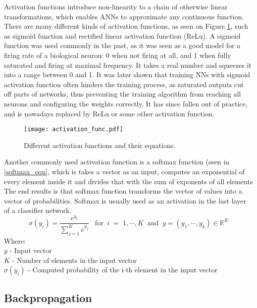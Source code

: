 Activation functions introduce non-linearity to a chain of otherwise linear transformations, which enables ANNs to approximate any continuous function\cite{geron}.
There are many different kinds of activation functions, as seen on Figure \ref{activation_functions}, such as sigmoid function and rectified linear activation function (ReLu).
A sigmoid function was used commonly in the past, as it was seen as a good model for a firing rate of a biological neuron: 0 when not firing at all, and 1 when fully saturated and firing at maximal frequency\cite{cs231n}.
It takes a real number and squeezes it into a range between 0 and 1.
It was later shown that training NNs with sigmoid activation function often hinders the training process, as saturated outputs cut off parts of networks, thus preventing the training algorithm from reaching all neurons and configuring the weights correctly\cite{cs231n}.
It has since fallen out of practice, and is nowadays replaced by ReLu or some other activation function.

\begin{figure}[ht!]
        \centering
        \texttt{[image: activation\_func.pdf]} 
        \caption{Different activation functions and their equations.}
        \label{activation_functions}
\end{figure}


Another commonly used activation function is a softmax function (seen in \ref{softmax_equ}, which is takes a vector as an input, computes an exponential of every element inside it and divides that with the sum of exponents of all elements\cite{geron}
The end results is that softmax function transforms the vector of values into a vector of probabilities.
Softmax is usually used as an activation in the last layer of a classifier network. 
\begin{equation}\label{softmax_equ}
    \sigma(y_i) = \frac{e^{y_i}}{\sum_{j=1}^{K}e^{y_j}}\;\;\;\text{for}\;\;i\;=\;1,\cdots,K\;\;\text{and}\;\;y=(y_1,\cdots,y_k)\in\mathbb{R}^K
\end{equation}
Where:\\
$y$ - Input vector\\
$K$ - Number of elements in the input vector\\
$\sigma(y_i)$ - Computed probability of the i-th element in the input vector \\

\subsection{ Backpropagation}


